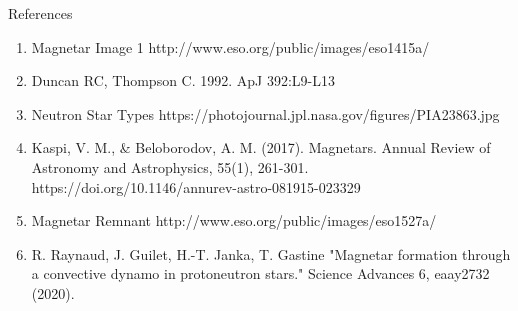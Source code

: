 \documentclass[hyperref=pdftex, presentation]{beamer}
\begin{document}
\begin{frame}{References}
	\begin{enumerate}
		\item Magnetar Image 1 http://www.eso.org/public/images/eso1415a/
		\item Duncan RC, Thompson C. 1992. ApJ 392:L9-L13
		\item Neutron Star Types https://photojournal.jpl.nasa.gov/figures/PIA23863.jpg	
		\item Kaspi, V. M., \& Beloborodov, A. M. (2017). Magnetars. Annual Review of Astronomy and Astrophysics, 55(1), 261-301. https://doi.org/10.1146/annurev-astro-081915-023329 	
		\item Magnetar Remnant http://www.eso.org/public/images/eso1527a/
		\item R. Raynaud, J. Guilet, H.-T. Janka, T. Gastine "Magnetar formation through a convective dynamo in protoneutron stars."
Science Advances 6, eaay2732 (2020).

	\end{enumerate}
\end{frame}
\end{document}

